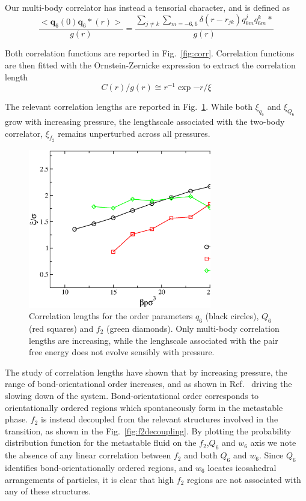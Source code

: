 \documentclass[twocolumn,superscriptaddress]{revtex4-1}
\begin{document}
Our multi-body correlator has instead a tensorial character, and is defined as
\begin{equation}
\frac{<\mathbf{q}_6(0)\mathbf{q}_6*(r)>}{g(r)}=\frac{\sum_{j\neq k}\sum_{m=-6,6}\delta(r-r_{jk})q_{6m}^jq_{6m}^k*}{g(r)}
\end{equation}

Both correlation functions are reported in Fig.~\ref{fig:corr}. Correlation functions are then
fitted with the Ornstein-Zernicke expression to extract the correlation length
\begin{equation}
C(r)/g(r)\cong r^{-1}\exp{-r/\xi}
\end{equation}

The relevant correlation lengths are reported in Fig.~\ref{fig:lengths}. While both
$\xi_{q_6}$ and $\xi_{Q_6}$ grow with increasing pressure, the lengthscale associated
with the two-body correlator, $\xi_{f_2}$ remains unperturbed across all pressures.


\begin{figure}
 \centering
 \includegraphics[width=8cm]{./figures/lenghts.eps}
 \caption{Correlation lengths for the order parameters $q_6$ (black circles),
$Q_6$ (red squares) and $f_2$ (green diamonds). Only multi-body correlation lengths
are increasing, while the lenghscale associated with the pair free energy does not
evolve sensibly with pressure.}
 \label{fig:lengths}
\end{figure}

The study of correlation lengths have shown that by increasing pressure, the range of
bond-orientational order increases, and as shown in Ref.~\cite{tanaka,mathieu_icosahedra}
driving the slowing down of the system. Bond-orientational order corresponds to
orientationally ordered regions which spontaneously form in the metastable phase.
$f_2$ is instead decoupled from the relevant structures involved in the transition, as
shown in the Fig.~\ref{fig:f2decoupling}. By plotting the probability distribution
function for the metastable fluid on the $f_2$,$Q_6$ and $w_6$ axis we note the
absence of any linear correlation between $f_2$ and both $Q_6$ and $w_6$. Since
$Q_6$ identifies bond-orientationally ordered regions, and $w_6$ locates icosahedral
arrangements of particles, it is clear that high $f_2$ regions are not associated
with any of these structures.
\end{document}
